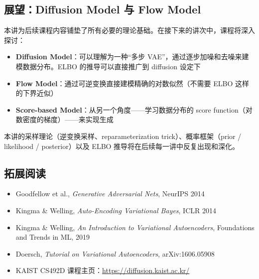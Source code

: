 \subsection{展望：Diffusion Model 与 Flow Model}

本讲为后续课程内容铺垫了所有必要的理论基础。在接下来的讲次中，课程将深入探讨：

\begin{itemize}
    \item \textbf{Diffusion Model}：可以理解为一种``多步 VAE''，通过逐步加噪和去噪来建模数据分布。ELBO 的推导可以直接推广到 diffusion 设定下
    \item \textbf{Flow Model}：通过可逆变换直接建模精确的对数似然（不需要 ELBO 这样的下界近似）
    \item \textbf{Score-based Model}：从另一个角度——学习数据分布的 score function（对数密度的梯度）——来实现生成
\end{itemize}

本讲的采样理论（逆变换采样、reparameterization trick）、概率框架（prior / likelihood / posterior）以及 ELBO 推导将在后续每一讲中反复出现和深化。

\subsection{拓展阅读}

\begin{itemize}
    \item Goodfellow et al., \textit{Generative Adversarial Nets}, NeurIPS 2014
    \item Kingma \& Welling, \textit{Auto-Encoding Variational Bayes}, ICLR 2014
    \item Kingma \& Welling, \textit{An Introduction to Variational Autoencoders}, Foundations and Trends in ML, 2019
    \item Doersch, \textit{Tutorial on Variational Autoencoders}, arXiv:1606.05908
    \item KAIST CS492D 课程主页：\url{https://diffusion.kaist.ac.kr/}
\end{itemize}



